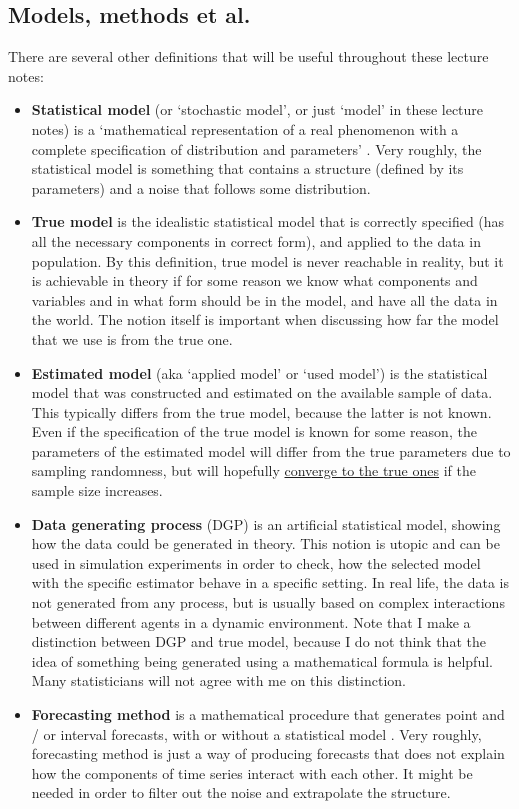 \documentclass[
]{book}
\providecommand{\tightlist}{%
  \setlength{\itemsep}{0pt}\setlength{\parskip}{0pt}}
\theoremstyle{definition}
\theoremstyle{definition}
\theoremstyle{definition}
\theoremstyle{definition}
\theoremstyle{remark}
\begin{document}
\hypertarget{modelsMethods}{%
\subsection{Models, methods et al.~}\label{modelsMethods}}

There are several other definitions that will be useful throughout these lecture notes:

\begin{itemize}
\tightlist
\item
  \textbf{Statistical model} (or `stochastic model', or just `model' in these lecture notes) is a `mathematical representation of a real phenomenon with a complete specification of distribution and parameters' \citep{Svetunkov2019a}. Very roughly, the statistical model is something that contains a structure (defined by its parameters) and a noise that follows some distribution.
\item
  \textbf{True model} is the idealistic statistical model that is correctly specified (has all the necessary components in correct form), and applied to the data in population. By this definition, true model is never reachable in reality, but it is achievable in theory if for some reason we know what components and variables and in what form should be in the model, and have all the data in the world. The notion itself is important when discussing how far the model that we use is from the true one.
\item
  \textbf{Estimated model} (aka `applied model' or `used model') is the statistical model that was constructed and estimated on the available sample of data. This typically differs from the true model, because the latter is not known. Even if the specification of the true model is known for some reason, the parameters of the estimated model will differ from the true parameters due to sampling randomness, but will hopefully \protect\hyperlink{statistics}{converge to the true ones} if the sample size increases.
\item
  \textbf{Data generating process} (DGP) is an artificial statistical model, showing how the data could be generated in theory. This notion is utopic and can be used in simulation experiments in order to check, how the selected model with the specific estimator behave in a specific setting. In real life, the data is not generated from any process, but is usually based on complex interactions between different agents in a dynamic environment. Note that I make a distinction between DGP and true model, because I do not think that the idea of something being generated using a mathematical formula is helpful. Many statisticians will not agree with me on this distinction.
\item
  \textbf{Forecasting method} is a mathematical procedure that generates point and / or interval forecasts, with or without a statistical model \citep{Svetunkov2019a}. Very roughly, forecasting method is just a way of producing forecasts that does not explain how the components of time series interact with each other. It might be needed in order to filter out the noise and extrapolate the structure.
\end{itemize}
\end{document}

